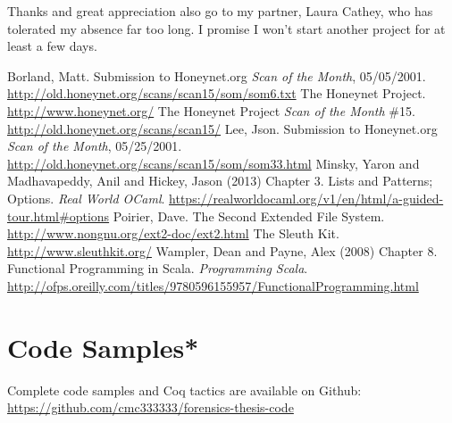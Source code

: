 \documentclass[nocopyrightspace]{sigplanconf}
\begin{document}
Thanks and great appreciation also go to my partner, Laura Cathey, who has
tolerated my absence far too long. I promise I won't start another project for
at least a few days.





\begin{thebibliography}{}
\softraggedright

  Borland, Matt. Submission to Honeynet.org \emph{Scan of the Month},
  05/05/2001. \url{http://old.honeynet.org/scans/scan15/som/som6.txt}
  The Honeynet Project. \url{http://www.honeynet.org/}
  The Honeynet Project \emph{Scan of the Month} \#15.
  \url{http://old.honeynet.org/scans/scan15/}
  Lee, Json. Submission to Honeynet.org \emph{Scan of the Month}, 05/25/2001.
  \url{http://old.honeynet.org/scans/scan15/som/som33.html}
  Minsky, Yaron and Madhavapeddy, Anil and Hickey, Jason (2013) Chapter 3.
  Lists and Patterns; Options. {\em Real World OCaml}.
  \url{https://realworldocaml.org/v1/en/html/a-guided-tour.html#options}
  Poirier, Dave. The Second Extended File System.
  \url{http://www.nongnu.org/ext2-doc/ext2.html}
  The Sleuth Kit. \url{http://www.sleuthkit.org/}
  Wampler, Dean and Payne, Alex (2008) Chapter 8. Functional Programming in
  Scala. {\em Programming Scala}. 
  \url{http://ofps.oreilly.com/titles/9780596155957/FunctionalProgramming.html}

\end{thebibliography}

\appendix

\section{Code Samples*}
Complete code samples and Coq tactics are available on Github:
\url{https://github.com/cmc333333/forensics-thesis-code}
\end{document}
